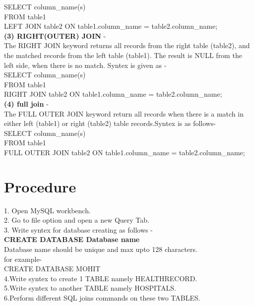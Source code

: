 \documentclass[100pt]{article}
\begin{document}
         SELECT column_name(s)\\
         FROM table1\\
         LEFT JOIN table2 ON table1.column_name = table2.column_name;\\
         
    \textbf{(3) RIGHT(OUTER) JOIN} - \\
    The RIGHT JOIN keyword returns all records from the right table (table2), and the matched records from the left table (table1). The result is NULL from the left side, when there is no match. Syntex is given as - \\
    
        SELECT column_name(s)\\
        FROM table1\\
        RIGHT JOIN table2 ON table1.column_name = table2.column_name;\\
        
    \textbf{(4) full join} - \\
    The FULL OUTER JOIN keyword return all records when there is a match in either left (table1) or right (table2) table records.Syntex is as follows-\\
    
        SELECT column_name(s)\\
        FROM table1\\
        FULL OUTER JOIN table2 ON table1.column_name = table2.column_name;\\            
   
    
    	\section{Procedure}
    	1. Open MySQL workbench.\\
    	2. Go to file option and open a new Query Tab.\\
    	3. Write syntex for database creating as follows - \\
    	
    	\textbf{ CREATE DATABASE Database name }\\
    	
    	Database name should be unique and max upto 128 characters.\\
    	for example-\\
    	CREATE DATABASE MOHIT\\

    	4.Write syntex to create 1 TABLE namely HEALTHRECORD.\\
    	5.Write syntex to another TABLE namely HOSPITALS.\\
    	6.Perform different SQL joins commands on these two TABLES.\\
    	
\end{document}

